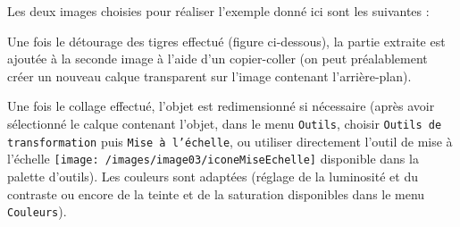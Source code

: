 Les deux images choisies pour réaliser l'exemple donné ici sont les suivantes :
 







Une fois le détourage des tigres effectué (figure ci-dessous), la partie extraite est ajoutée à la seconde image à l'aide d'un copier-coller (on peut préalablement créer un nouveau calque transparent sur l'image contenant l'arrière-plan). 


Une fois le collage effectué, l'objet est redimensionné si nécessaire (après avoir sélectionné le calque contenant l'objet, dans le menu \texttt{Outils}, choisir \texttt{Outils de transformation} puis \texttt{Mise à l'échelle}, ou utiliser directement l'outil de mise à l'échelle \texttt{[image: /images/image03/iconeMiseEchelle]} disponible dans la palette d'outils). Les couleurs sont adaptées (réglage de la luminosité et du contraste ou encore de la teinte et de la saturation disponibles dans le menu \texttt{Couleurs}).



